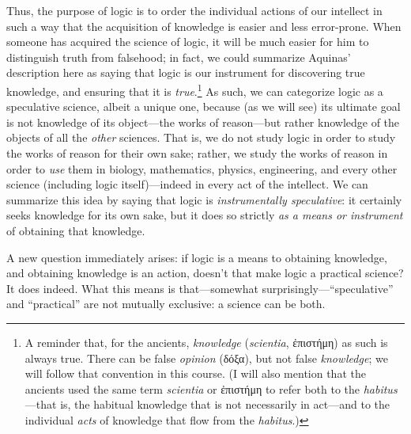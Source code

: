 \documentclass[
  12pt,
]{memoir}
\begin{document}
Thus, the purpose of logic is to order the individual actions of our
intellect in such a way that the acquisition of knowledge is easier and
less error-prone. When someone has acquired the science of logic, it
will be much easier for him to distinguish truth from falsehood; in
fact, we could summarize Aquinas' description here as saying that logic
is our instrument for discovering true knowledge, and ensuring that it
is \emph{true}.\footnote{A reminder that, for the ancients,
  \emph{knowledge} (\emph{scientia}, ἐπιστήμη) as such is always true.
  There can be false \emph{opinion} (δόξα), but not false
  \emph{knowledge}; we will follow that convention in this course. (I
  will also mention that the ancients used the same term \emph{scientia}
  or ἐπιστήμη to refer both to the \emph{habitus}---that is, the
  habitual knowledge that is not necessarily in act---and to the
  individual \emph{acts} of knowledge that flow from the
  \emph{habitus}.)} As such, we can categorize logic as a speculative
science, albeit a unique one, because (as we will see) its ultimate goal
is not knowledge of its object---the works of reason---but rather
knowledge of the objects of all the \emph{other} sciences. That is, we
do not study logic in order to study the works of reason for their own
sake; rather, we study the works of reason in order to \emph{use} them
in biology, mathematics, physics, engineering, and every other science
(including logic itself)---indeed in every act of the intellect. We can
summarize this idea by saying that logic is \emph{instrumentally
speculative}: it certainly seeks knowledge for its own sake, but it does
so strictly \emph{as a means or instrument} of obtaining that knowledge.

A new question immediately arises: if logic is a means to obtaining
knowledge, and obtaining knowledge is an action, doesn't that make logic
a practical science? It does indeed. What this means is that---somewhat
surprisingly---``speculative'' and ``practical'' are not mutually
exclusive: a science can be both.
\end{document}

